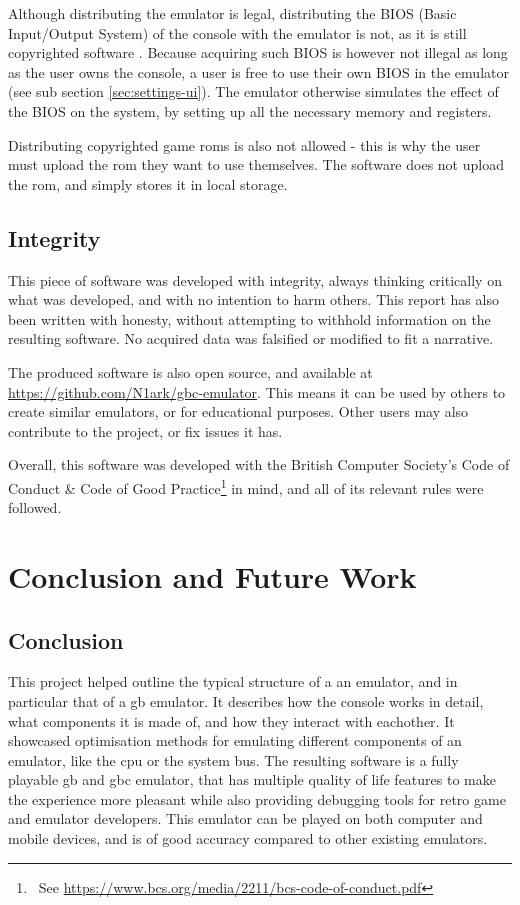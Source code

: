\documentclass[11pt]{informatics-report}
\newcommand{\ftnt}[1]{\footnote{~See \url{#1}}}
\begin{document}
Although distributing the emulator is legal, distributing the BIOS (Basic Input/Output System) of the console with the emulator is not, as it is still copyrighted software \cite{emulation_white_paper}. Because acquiring such BIOS is however not illegal as long as the user owns the console, a user is free to use their own BIOS in the emulator (see sub section \ref{sec:settings-ui}). The emulator otherwise simulates the effect of the BIOS on the system, by setting up all the necessary memory and registers.

Distributing copyrighted game \glspl{rom} is also not allowed - this is why the user must upload the \gls{rom} they want to use themselves. The software does not upload the \gls{rom}, and simply stores it in local storage.

\section{Integrity}

This piece of software was developed with integrity, always thinking critically on what was developed, and with no intention to harm others. This report has also been written with honesty, without attempting to withhold information on the resulting software. No acquired data was falsified or modified to fit a narrative.

The produced software is also open source, and available at \url{https://github.com/N1ark/gbc-emulator}. This means it can be used by others to create similar emulators, or for educational purposes. Other users may also contribute to the project, or fix issues it has.

Overall, this software was developed with the British Computer Society's Code of Conduct \& Code of Good Practice\ftnt{https://www.bcs.org/media/2211/bcs-code-of-conduct.pdf} in mind, and all of its relevant rules were followed.

\chapter{Conclusion and Future Work}

\section{Conclusion}

This project helped outline the typical structure of a an emulator, and in particular that of a \glsdesc{gb} emulator. It describes how the console works in detail, what components it is made of, and how they interact with eachother. It showcased optimisation methods for emulating different components of an emulator, like the \gls{cpu} or the system bus. The resulting software is a fully playable \glsdesc{gb} and \glsdesc{gbc} emulator, that has multiple quality of life features to make the experience more pleasant while also providing debugging tools for retro game and emulator developers. This emulator can be played on both computer and mobile devices, and is of good accuracy compared to other existing emulators.
\end{document}
